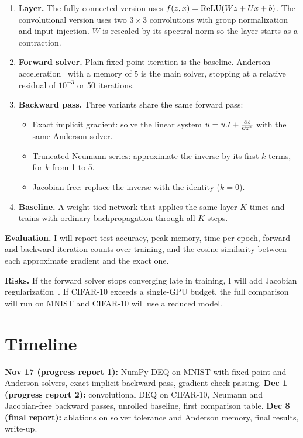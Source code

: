 \documentclass[11pt]{article}
\begin{document}
\begin{enumerate}
  \item \textbf{Layer.} The fully connected version uses
    $f(z, x) = \operatorname{ReLU}(Wz + Ux + b)$. The convolutional version uses two
    $3\times 3$ convolutions with group normalization and input injection. $W$
    is rescaled by its spectral norm so the layer starts as a contraction.
  \item \textbf{Forward solver.} Plain fixed-point iteration is the baseline.
    Anderson acceleration~\cite{anderson1965iterative} with a memory of 5 is
    the main solver, stopping at a relative residual of $10^{-3}$ or 50
    iterations.
  \item \textbf{Backward pass.} Three variants share the same forward pass:
    \begin{itemize}
      \item Exact implicit gradient: solve the linear system
        $u = uJ + \frac{\partial \ell}{\partial z^{*}}$ with the same Anderson solver.
      \item Truncated Neumann series: approximate the inverse by its first $k$
        terms, for $k$ from 1 to 5.
      \item Jacobian-free: replace the inverse with the identity ($k = 0$).
    \end{itemize}
  \item \textbf{Baseline.} A weight-tied network that applies the same layer
    $K$ times and trains with ordinary backpropagation through all $K$ steps.
\end{enumerate}

\textbf{Evaluation.} I will report test accuracy, peak memory, time per epoch,
forward and backward iteration counts over training, and the cosine similarity
between each approximate gradient and the exact one.

\textbf{Risks.} If the forward solver stops converging late in training, I will
add Jacobian regularization~\cite{bai2021stabilizing}. If CIFAR-10 exceeds a
single-GPU budget, the full comparison will run on MNIST and CIFAR-10 will use
a reduced model.

\section{Timeline}

\textbf{Nov 17 (progress report 1):} NumPy DEQ on MNIST with fixed-point and
Anderson solvers, exact implicit backward pass, gradient check passing.
\textbf{Dec 1 (progress report 2):} convolutional DEQ on CIFAR-10, Neumann and
Jacobian-free backward passes, unrolled baseline, first comparison table.
\textbf{Dec 8 (final report):} ablations on solver tolerance and Anderson
memory, final results, write-up.

\printrefs
\end{document}
